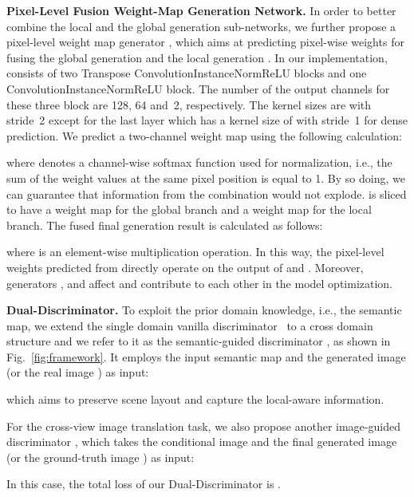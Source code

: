 \documentclass[10pt,twocolumn,letterpaper]{article}
\begin{document}
\par\noindent\textbf{Pixel-Level Fusion Weight-Map Generation Network.} In order to better combine the local and the global generation sub-networks, we further propose a pixel-level weight map generator , which aims at predicting pixel-wise weights for fusing the global generation  and the local generation . 
In our implementation,  consists of two Transpose ConvolutionInstanceNormReLU blocks and one ConvolutionInstanceNormReLU block.
The number of the output channels for these three block are 128, 64 and~2, respectively. The kernel sizes are  with stride~2 except for the last layer which has a kernel size of  with stride~1 for dense prediction. 
We predict a two-channel weight map  using the following calculation:

where  denotes a channel-wise softmax function used for normalization, i.e., the sum of the weight values at the same pixel position is equal to 1. By so doing, we can guarantee that information from the combination would not explode.  is sliced to have a weight map  for the global branch and a weight map  for the local branch. The fused final generation result is calculated as follows:

where  is an element-wise multiplication operation.
In this way, the pixel-level weights predicted from  directly operate on the output of  and .
Moreover, generators ,  and  affect and contribute to each other in the model optimization. 

\par\noindent\textbf{Dual-Discriminator.} To exploit the prior domain knowledge, i.e., the semantic map, we extend the single domain vanilla discriminator~\cite{goodfellow2014generative} to a cross domain structure and we refer to it as the semantic-guided discriminator , as shown in Fig.~\ref{fig:framework}. It employs the input semantic map  and the generated image  (or the real image ) as input: 

which aims to preserve scene layout and capture the local-aware information.




For the cross-view image translation task, we also propose another image-guided discriminator , which takes the conditional image  and the final generated image  (or the ground-truth image ) as input:

In this case, the total loss of our Dual-Discriminator  is .
\end{document}
